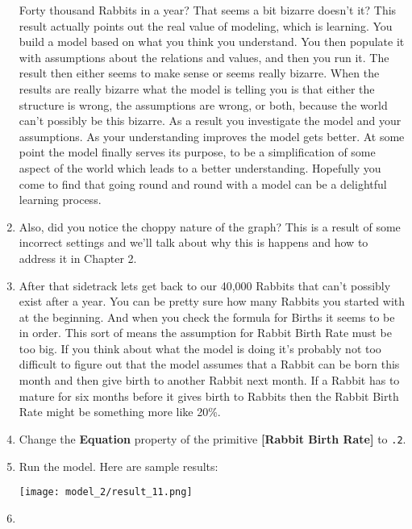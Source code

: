 \documentclass[]{memoir}
\makeatletter
\def\maxwidth{\ifdim\Gin@nat@width>\linewidth\linewidth
\else\Gin@nat@width\fi}
\let\Oldincludegraphics\includegraphics
\renewcommand{\includegraphics}[1]{\Oldincludegraphics[width=\maxwidth]{#1}}
\newcommand{\p}[1]{\textbf{{[}#1{]}}}
\newcommand{\e}[1]{\texttt{#1}}
\renewcommand{\a}[1]{\textbf{#1}}
\makeatother
\begin{document}
\begin{oframed}
\begin{enumerate}
Forty thousand Rabbits in a year? That seems a bit bizarre doesn't it? This result actually points out the real value of modeling, which is learning. You build a model based on what you think you understand. You then populate it with assumptions about the relations and values, and then you run it. The result then either seems to make sense or seems really bizarre. When the results are really bizarre what the model is telling you is that either the structure is wrong, the assumptions are wrong, or both, because the world can't possibly be this bizarre. As a result you investigate the model and your assumptions. As your understanding improves the model gets better. At some point the model finally serves its purpose, to be a simplification of some aspect of the world which leads to a better understanding. Hopefully you come to find that going round and round with a model can be a delightful learning process.


\item 

Also, did you notice the choppy nature of the graph? This is a result of some incorrect settings and we'll talk about why this is happens and how to address it in Chapter 2.


\item 

After that sidetrack lets get back to our 40,000 Rabbits that can't possibly exist after a year. You can be pretty sure how many Rabbits you started with at the beginning. And when you check the formula for Births it seems to be in order. This sort of means the assumption for Rabbit Birth Rate must be too big. If you think about what the model is doing it's probably not too difficult to figure out that the model assumes that a Rabbit can be born this month and then give birth to another Rabbit next month. If a Rabbit has to mature for six months before it gives birth to Rabbits then the Rabbit Birth Rate might be something more like 20\%.


\item  Change the \a{Equation} property of the primitive \p{Rabbit Birth Rate} to \e{.2}.
\item Run the model. Here are sample results:\par \begin{minipage}{\linewidth}  \centering \texttt{[image: model\_2/result\_11.png]}
\end{minipage}
\item 


\end{enumerate}
\end{oframed}
\end{document}
